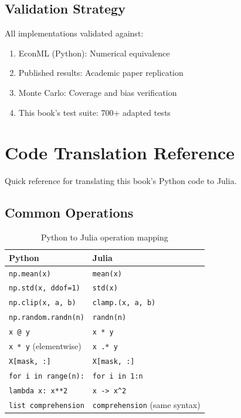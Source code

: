 \subsection{Validation Strategy}

All implementations validated against:

\begin{enumerate}
    \item EconML (Python): Numerical equivalence
    \item Published results: Academic paper replication
    \item Monte Carlo: Coverage and bias verification
    \item This book's test suite: 700+ adapted tests
\end{enumerate}


\section{Code Translation Reference}\label{sec:code_reference}

Quick reference for translating this book's Python code to Julia.

\subsection{Common Operations}

\begin{table}[htbp]
\centering
\caption{Python to Julia operation mapping}
\label{tab:operation_mapping}
\begin{tabular}{ll}
\toprule
\textbf{Python} & \textbf{Julia} \\
\midrule
\texttt{np.mean(x)} & \texttt{mean(x)} \\
\texttt{np.std(x, ddof=1)} & \texttt{std(x)} \\
\texttt{np.clip(x, a, b)} & \texttt{clamp.(x, a, b)} \\
\texttt{np.random.randn(n)} & \texttt{randn(n)} \\
\texttt{x @ y} & \texttt{x * y} \\
\texttt{x * y} (elementwise) & \texttt{x .* y} \\
\texttt{X[mask, :]} & \texttt{X[mask, :]} \\
\texttt{for i in range(n):} & \texttt{for i in 1:n} \\
\texttt{lambda x: x**2} & \texttt{x -> x\textasciicircum 2} \\
\texttt{list comprehension} & \texttt{comprehension} (same syntax) \\
\bottomrule
\end{tabular}
\end{table}

